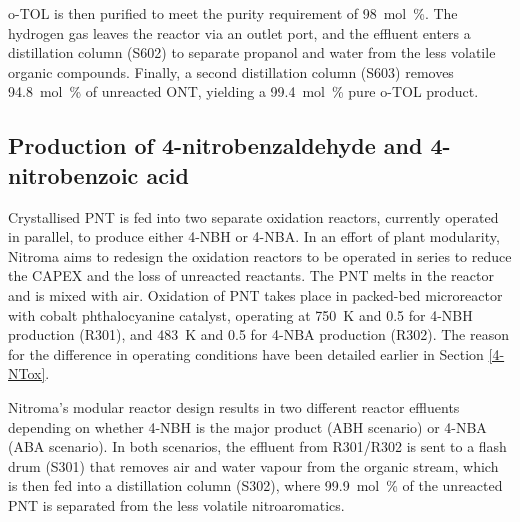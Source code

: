 
o-TOL is then purified to meet the purity requirement of \SI{98}{mol\percent}.
The hydrogen gas leaves the reactor via an outlet port, and the effluent enters a distillation column (S602) to separate propanol and water from the less volatile organic compounds.
Finally, a second distillation column (S603) removes \SI{94.8}{mol\percent} of unreacted ONT, yielding a \SI{99.4}{mol\percent} pure o-TOL product.
 
\subsection{Production of 4-nitrobenzaldehyde and 4-nitrobenzoic acid}
Crystallised PNT is fed into two separate oxidation reactors, currently operated in parallel, to produce either 4-NBH or 4-NBA. In an effort of plant modularity, Nitroma aims to redesign the oxidation reactors to be operated in series to reduce the CAPEX and the loss of unreacted reactants. The PNT melts in the reactor and is mixed with air. Oxidation of PNT takes place in packed-bed microreactor with cobalt phthalocyanine catalyst, operating at \SI{750}{\K} and \SI{0.5}{\atm} for 4-NBH production (R301), and \SI{483}{\K} and \SI{0.5}{\atm} for 4-NBA production (R302). The reason for the difference in operating conditions have been detailed earlier in Section \ref{4-NTox}.


Nitroma's modular reactor design results in two different reactor effluents depending on whether 4-NBH is the major product (ABH scenario) or 4-NBA (ABA scenario). In both scenarios, the effluent from R301/R302 is sent to a flash drum (S301) that removes air and water vapour from the organic stream, which is then fed into a distillation column (S302), where \SI{99.9}{mol\percent} of the unreacted PNT is separated from the less volatile nitroaromatics. 

